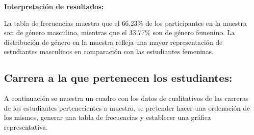 \documentclass{article}
\begin{document}
\textbf{Interpretación de resultados:}

La tabla de frecuencias muestra que el 66.23\% de los participantes en la muestra son de género masculino, mientras que el 33.77\% son de género femenino. La distribución de género en la muestra refleja una mayor representación de estudiantes masculinos en comparación con las estudiantes femeninas.

\newpage

\subsection{Carrera a la que pertenecen los estudiantes:}

A continuación se muestra un cuadro con los datos de cualitativos de las carreras de los estudiantes pertenecientes a muestra, se pretender hacer una ordenación de los mismos, generar una tabla de frecuencias y establecer una gráfica representativa.
\end{document}
